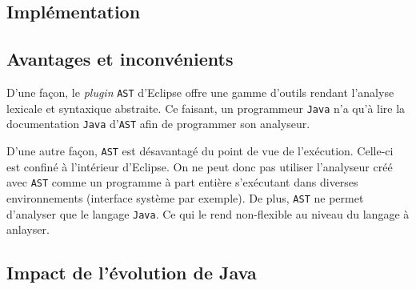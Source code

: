\documentclass[11pt,french]{article}
\begin{document}
        \subsection{Implémentation} %
        \label{sub:implementation}

        \subsection{Avantages et inconvénients} %
        \label{sub:avantages-inconvenients}
            D'une façon, le {\it plugin} {\tt AST} d'Eclipse offre une gamme d'outils rendant
            l'analyse lexicale et syntaxique abstraite. Ce faisant, un programmeur {\tt Java} n'a
            qu'à lire la documentation {\tt Java} d'{\tt AST} afin de programmer son analyseur.

            D'une autre façon, {\tt AST} est désavantagé du point de vue de l'exécution. Celle-ci
            est confiné à l'intérieur d'Eclipse. On ne peut donc pas utiliser l'analyseur créé avec
            {\tt AST} comme un programme à part entière s'exécutant dans diverses environnements
            (interface système par exemple). De plus, {\tt AST} ne permet d'analyser que le langage
            {\tt Java}. Ce qui le rend non-flexible au niveau du langage à anlayser.

        \subsection{Impact de l'évolution de Java} %
        \label{sub:impact-evolution-java}

\end{document}
